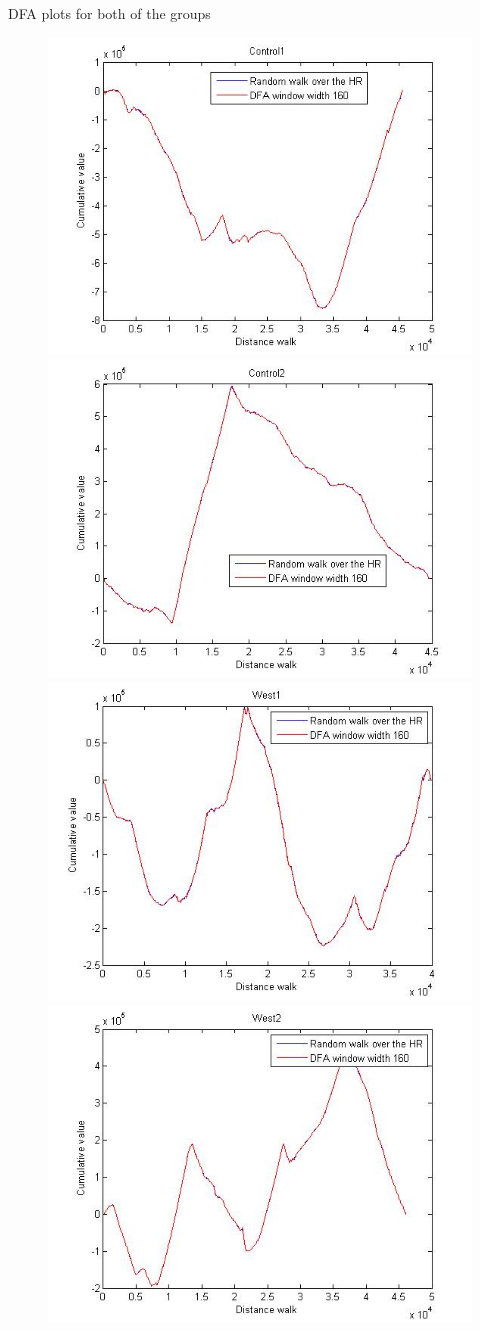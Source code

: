 \documentclass[t,12pt,english
\ifx\beamermode\undefined\else,\beamermode\fi
]{beamer}
\begin{document}
\begin{frame}{DFA plots for both of the groups}
\begin{figure}[!htbp]
%
\centering
\includegraphics[width=.7\textwidth]{E3.jpg}\\
\includegraphics[width=.7\textwidth]{E4.jpg}\\
\endminipage\hfill
{}%
\centering
\includegraphics[width=.7\textwidth]{E8.jpg}\\
\includegraphics[width=.7\textwidth]{E9.jpg}\\
\endminipage\hfill
\end{figure}


\end{frame}
\end{document}
